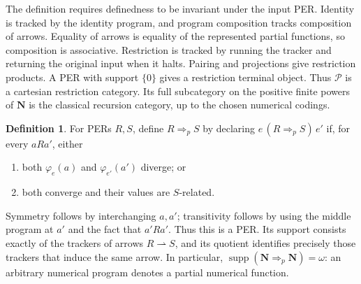 \documentclass[11pt]{article}
\theoremstyle{definition}
\newtheorem{definition}[theorem]{Definition}
\newcommand{\N}{\omega}
\newcommand{\Pcat}{\mathcal P}
\newcommand{\supp}{\operatorname{supp}}
\newcommand{\pArr}{\mathbin{\Rightarrow_{\!p}}}
\begin{document}
The definition requires definedness to be invariant under the input PER.
Identity is tracked by the identity program, and program composition
tracks composition of arrows. Equality of arrows is equality of the
represented partial functions, so composition is associative.
Restriction is tracked by running the tracker and returning the original
input when it halts. Pairing and projections give restriction products.
A PER with support $\{0\}$ gives a restriction terminal object.
Thus $\Pcat$ is a cartesian restriction category. Its full subcategory
on the positive finite powers of $\mathbf N$ is the classical
recursion category, up to the chosen numerical codings.

\begin{definition}\label{def:partial-function-per}
For PERs $R,S$, define $R\pArr S$ by declaring
$e\,(R\pArr S)\,e'$ if, for every $aRa'$, either
\begin{enumerate}[nosep,label=(\roman*)]
\item both $\varphi_e(a)$ and $\varphi_{e'}(a')$ diverge; or
\item both converge and their values are $S$-related.
\end{enumerate}
\end{definition}

Symmetry follows by interchanging $a,a'$; transitivity follows by using
the middle program at $a'$ and the fact that $a'Ra'$. Thus this is a
PER. Its support consists exactly of the trackers of arrows
$R\rightharpoonup S$, and its quotient identifies precisely those
trackers that induce the same arrow. In particular,
$\supp(\mathbf N\pArr\mathbf N)=\N$: an arbitrary numerical
program denotes a partial numerical function.
\end{document}
